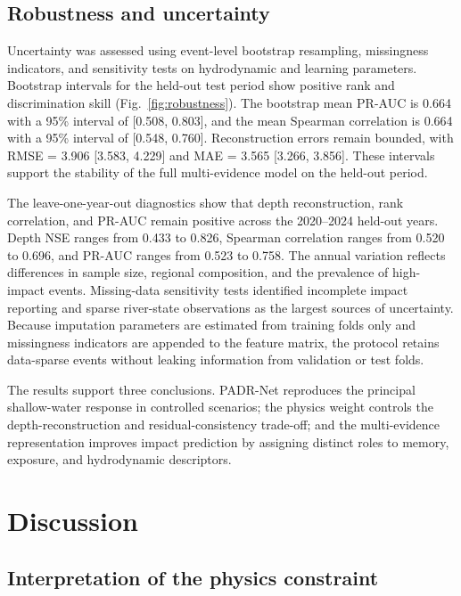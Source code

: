 \documentclass[pdflatex,sn-mathphys-ay]{sn-jnl}
\theoremstyle{thmstyleone}
\begin{document}
\subsection{Robustness and uncertainty}
\label{subsec:robustness_results}

Uncertainty was assessed using event-level bootstrap resampling,
missingness indicators, and sensitivity tests on hydrodynamic and
learning parameters.  Bootstrap intervals for the held-out test period
show positive rank and discrimination skill
(Fig.~\ref{fig:robustness}).  The bootstrap mean PR-AUC is 0.664 with a
95\% interval of [0.508, 0.803], and the mean Spearman correlation is
0.664 with a 95\% interval of [0.548, 0.760].  Reconstruction errors
remain bounded, with RMSE = 3.906 [3.583, 4.229] and MAE = 3.565
[3.266, 3.856].  These intervals support the stability of the full
multi-evidence model on the held-out period.

The leave-one-year-out diagnostics show that depth reconstruction,
rank correlation, and PR-AUC remain positive across the 2020--2024
held-out years.  Depth NSE ranges from 0.433 to 0.826, Spearman
correlation ranges from 0.520 to 0.696, and PR-AUC ranges from 0.523 to
0.758.  The annual variation reflects differences in sample size,
regional composition, and the prevalence of high-impact events.
Missing-data sensitivity tests identified incomplete impact reporting
and sparse river-state observations as the largest sources of
uncertainty.  Because imputation parameters are estimated from training
folds only and missingness indicators are appended to the feature
matrix, the protocol retains data-sparse events without leaking
information from validation or test folds.

The results support three conclusions.  PADR-Net reproduces the
principal shallow-water response in controlled scenarios; the physics
weight controls the depth-reconstruction and residual-consistency
trade-off; and the multi-evidence representation improves impact
prediction by assigning distinct roles to memory, exposure, and
hydrodynamic descriptors.

\section{Discussion}
\label{sec:discussion}

\subsection{Interpretation of the physics constraint}
\end{document}
